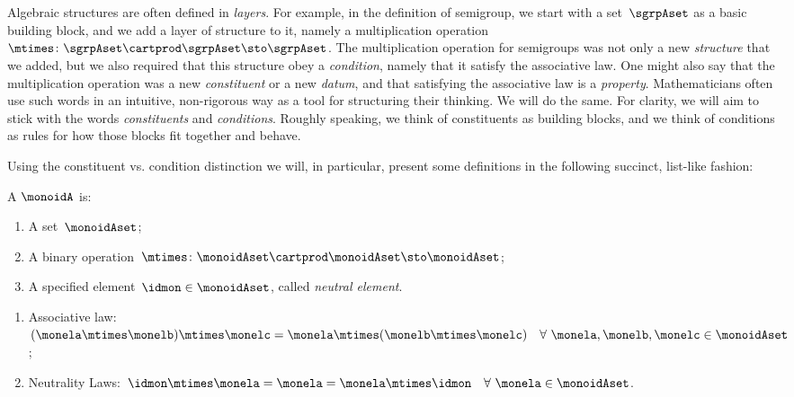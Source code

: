 

\section{}
\label{sec:parallelism-monoids}

Algebraic structures are often defined in \emph{layers}.
For example, in the definition of semigroup, we start with a set~$\sgrpAset$ as a basic building block, and we add a layer of structure to it, namely a multiplication operation~$\mtimes \colon \sgrpAset \cartprod \sgrpAset \sto \sgrpAset$.
The multiplication operation for semigroups was not only a new \emph{structure} that we added, but we also required that this structure obey a \emph{condition}, namely that it satisfy the associative law.
One might also say that the multiplication operation was a new \emph{constituent} or a new \emph{datum}, and that satisfying the associative law is a \emph{property}.
Mathematicians often use such words in an intuitive, non-rigorous way as a tool for structuring their thinking.
We will do the same.
For clarity, we will aim to stick with the words \emph{constituents} and \emph{conditions}.
Roughly speaking, we think of constituents as building blocks, and we think of conditions as rules for how those blocks fit together and behave.

Using the constituent vs. condition distinction we will, in particular, present some definitions in the following succinct, list-like fashion:

\begin{ctdefinition}[Monoid]
    \label{def:monoid}
    A \emph{}  $\monoidA$  is:
    \begin{body}
        \constit
        \begin{enumerate}
            \item A set~$\monoidAset$;
            \item A binary operation~$\mtimes  \colon \monoidAset \cartprod \monoidAset \sto \monoidAset$;
            \item A specified element~$\idmon \in \monoidAset$, called \emph{neutral element}.
        \end{enumerate}
        \condit
        \begin{enumerate}
            \item Associative law:~$(\monela\mtimes  \monelb)\mtimes  \monelc=
            \monela\mtimes  (\monelb\mtimes  \monelc) \quad  \forall \  \monela, \monelb, \monelc \in \monoidAset$;
            \item Neutrality Laws:~$\idmon\mtimes \monela=\monela=\monela\mtimes  \idmon \quad  \forall \ \monela \in \monoidAset $.
        \end{enumerate}
    \end{body}
\end{ctdefinition}


